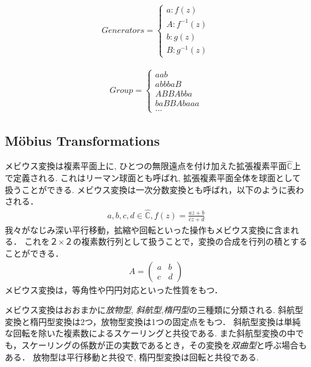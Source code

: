 \begin{minipage}{0.5\hsize}
 \begin{align*}
  Generators =
   \begin{cases}
    a \colon f(z) \\
    A \colon f^{-1}(z) \\
    b \colon g(z) \\
    B \colon g^{-1}(z)
   \end{cases}
 \end{align*}
\end{minipage}
\begin{minipage}{0.5\hsize}
 \begin{align*}
  Group =
   \begin{cases}
    aab\\
    abbbaB \\
    ABBAbba \\
    baBBAbaaa \\
    ...
   \end{cases}
 \end{align*}
\end{minipage}

\subsection{M\"obius Transformations}

メビウス変換は複素平面上に, ひとつの無限遠点を付け加えた拡張複素平面$\hat{\mathbb{C}}$上で定義される.
これはリーマン球面とも呼ばれ, 拡張複素平面全体を球面として扱うことができる.
メビウス変換は一次分数変換とも呼ばれ，以下のように表わされる．
\begin{align*}
 a, b, c, d\in \hat{\mathbb{C}}, f(z) = \frac{az + b}{cz + d}
\end{align*}
我々がなじみ深い平行移動，拡縮や回転といった操作もメビウス変換に含まれる．
これを２×２の複素数行列として扱うことで，変換の合成を行列の積とすることができる．
\begin{align*}
  A = \left(
    \begin{array}{ccc}
      a & b \\
      c & d
    \end{array}
  \right)
\end{align*}
メビウス変換は，等角性や円円対応といった性質をもつ．

メビウス変換はおおまかに\emph{放物型}, \emph{斜航型},\emph{楕円型}の三種類に分類される.
斜航型変換と楕円型変換は2つ，放物型変換は1つの固定点をもつ．
斜航型変換は単純な回転を除いた複素数によるスケーリングと共役である.
また斜航型変換の中でも，スケーリングの係数が正の実数であるとき，その変換を\emph{双曲型}と呼ぶ場合もある．
放物型は平行移動と共役で, 楕円型変換は回転と共役である.

